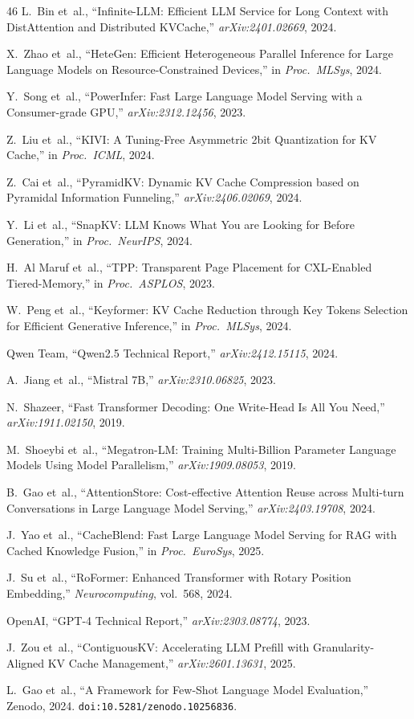 \documentclass[conference]{IEEEtran}
\begin{document}
\begin{thebibliography}{46}
 L.~Bin et~al., ``Infinite-LLM: Efficient LLM Service for Long Context with DistAttention and Distributed KVCache,'' \textit{arXiv:2401.02669}, 2024.

 X.~Zhao et~al., ``HeteGen: Efficient Heterogeneous Parallel Inference for Large Language Models on Resource-Constrained Devices,'' in \textit{Proc.\ MLSys}, 2024.

 Y.~Song et~al., ``PowerInfer: Fast Large Language Model Serving with a Consumer-grade GPU,'' \textit{arXiv:2312.12456}, 2023.

 Z.~Liu et~al., ``KIVI: A Tuning-Free Asymmetric 2bit Quantization for KV Cache,'' in \textit{Proc.\ ICML}, 2024.

 Z.~Cai et~al., ``PyramidKV: Dynamic KV Cache Compression based on Pyramidal Information Funneling,'' \textit{arXiv:2406.02069}, 2024.

 Y.~Li et~al., ``SnapKV: LLM Knows What You are Looking for Before Generation,'' in \textit{Proc.\ NeurIPS}, 2024.

 H.~Al Maruf et~al., ``TPP: Transparent Page Placement for CXL-Enabled Tiered-Memory,'' in \textit{Proc.\ ASPLOS}, 2023.

 W.~Peng et~al., ``Keyformer: KV Cache Reduction through Key Tokens Selection for Efficient Generative Inference,'' in \textit{Proc.\ MLSys}, 2024.

 Qwen Team, ``Qwen2.5 Technical Report,'' \textit{arXiv:2412.15115}, 2024.

 A.~Jiang et~al., ``Mistral 7B,'' \textit{arXiv:2310.06825}, 2023.

 N.~Shazeer, ``Fast Transformer Decoding: One Write-Head Is All You Need,'' \textit{arXiv:1911.02150}, 2019.

 M.~Shoeybi et~al., ``Megatron-LM: Training Multi-Billion Parameter Language Models Using Model Parallelism,'' \textit{arXiv:1909.08053}, 2019.

 B.~Gao et~al., ``AttentionStore: Cost-effective Attention Reuse across Multi-turn Conversations in Large Language Model Serving,'' \textit{arXiv:2403.19708}, 2024.

 J.~Yao et~al., ``CacheBlend: Fast Large Language Model Serving for RAG with Cached Knowledge Fusion,'' in \textit{Proc.\ EuroSys}, 2025.

 J.~Su et~al., ``RoFormer: Enhanced Transformer with Rotary Position Embedding,'' \textit{Neurocomputing}, vol.~568, 2024.

 OpenAI, ``GPT-4 Technical Report,'' \textit{arXiv:2303.08774}, 2023.

 J.~Zou et~al., ``ContiguousKV: Accelerating LLM Prefill with Granularity-Aligned KV Cache Management,'' \textit{arXiv:2601.13631}, 2025.

 L.~Gao et~al., ``A Framework for Few-Shot Language Model Evaluation,'' Zenodo, 2024. \texttt{doi:10.5281/zenodo.10256836}.

\end{thebibliography}
\end{document}
